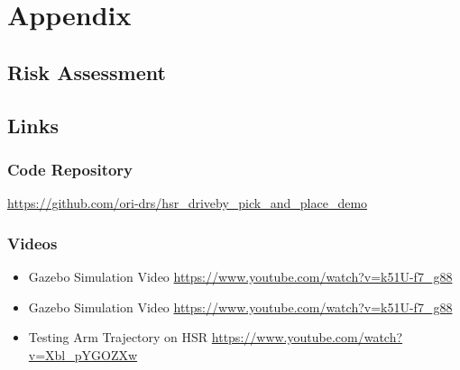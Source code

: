 \documentclass[11pt]{article}
\begin{document}
    \newpage

\newpage
\section{Appendix}
    \subsection{Risk Assessment}
        
    \subsection{Links}
        \subsubsection{Code Repository}
            \url{https://github.com/ori-drs/hsr_driveby_pick_and_place_demo}
        \subsubsection{Videos}
            \begin{itemize}
                \item Gazebo Simulation Video \url{https://www.youtube.com/watch?v=k51U-f7_g88}
                \item Gazebo Simulation Video \url{https://www.youtube.com/watch?v=k51U-f7_g88}
                \item Testing Arm Trajectory on HSR \url{https://www.youtube.com/watch?v=Xbl_pYGOZXw}
            \end{itemize}
    
\end{document}
